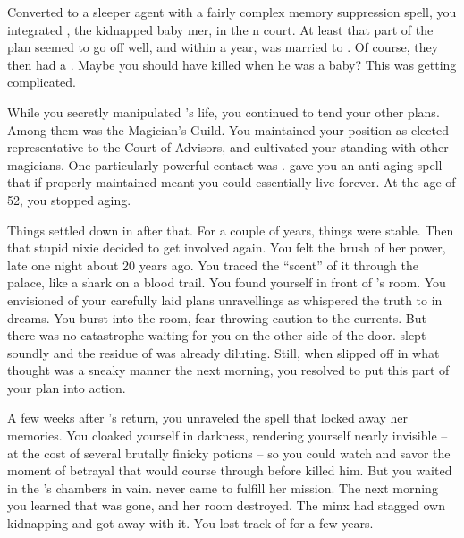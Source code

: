 \documentclass[char]{NeptuneBall}
\begin{document}
Converted to a sleeper agent with a fairly complex memory suppression spell, you integrated \cQueen{}, the kidnapped baby mer\cQueen{\kid}, in the \pAtlantis{}n court. At least that part of the plan seemed to go off well, and within a year, \cKing{} was married to \cQueen{}. Of course, they then had a \cAriel{\offspring}. Maybe you should have killed \cKing{} when he was a baby? This was getting complicated.

While you secretly manipulated \cKing{\King} \cKing{}'s life, you continued to tend your other plans. Among them was the Magician's Guild. You maintained your position as elected representative to the Court of Advisors, and cultivated your standing with other magicians. One particularly powerful contact was \cWitch{}. \cWitch{\They} gave you an anti-aging spell that if properly maintained meant you could essentially live forever. At the age of 52, you stopped aging.

Things settled down in \pAtlantis{} after that. For a couple of years, things were stable. Then that stupid nixie decided to get involved again. You felt the brush of her power, late one night about 20 years ago. You traced the ``scent'' of it through the palace, like a shark on a blood trail. You found yourself in front of \cQueen{}'s room. You envisioned of your carefully laid plans unravellings as \cNixie{} whispered the truth to \cQueen{} in dreams. You burst into the room, fear throwing caution to the currents. But there was no catastrophe waiting for you on the other side of the door. \cQueen{} slept soundly and the residue of \cNixie{} was already diluting. Still, when \cQueen{} slipped off in what \cQueen{\they} thought was a sneaky manner the next morning, you resolved to put this part of your plan into action.

A few weeks after \cQueen{}'s return, you unraveled the spell that locked away her memories. You cloaked yourself in darkness, rendering yourself nearly invisible -- at the cost of several brutally finicky potions -- so you could watch and savor the moment of betrayal that would course through \cKing{} before \cQueen{} killed him. But you waited in the \cKing{\King}'s chambers in vain. \cQueen{} never came to fulfill her mission. The next morning you learned that \cQueen{\they} was gone, and her room destroyed. The minx had stagged \cQueen{\them} own kidnapping and got away with it. You lost track of \cQueen{\them} for a few years.
\end{document}
